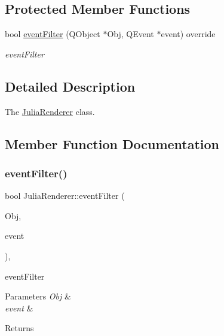 \subsection*{Protected Member Functions}
\begin{DoxyCompactItemize}
\item 
bool \hyperlink{classJuliaRenderer_a21a8248c28cf0035a14ad1ef98761356}{event\+Filter} (Q\+Object $\ast$Obj, Q\+Event $\ast$event) override
\begin{DoxyCompactList}\small\item\em event\+Filter \end{DoxyCompactList}\end{DoxyCompactItemize}


\subsection{Detailed Description}
The \hyperlink{classJuliaRenderer}{Julia\+Renderer} class. 

\subsection{Member Function Documentation}
\mbox{\label{classJuliaRenderer_a21a8248c28cf0035a14ad1ef98761356}} 
\subsubsection{\texorpdfstring{event\+Filter()}{eventFilter()}}
{\footnotesize\ttfamily bool Julia\+Renderer\+::event\+Filter (\begin{DoxyParamCaption}\item[{Q\+Object $\ast$}]{Obj,  }\item[{Q\+Event $\ast$}]{event }\end{DoxyParamCaption})\hspace{0.3cm}{\ttfamily [override]}, {\ttfamily [protected]}}



event\+Filter 


\begin{DoxyParams}{Parameters}
{\em Obj} & \\
\hline
{\em event} & \\
\hline
\end{DoxyParams}
\begin{DoxyReturn}{Returns}

\end{DoxyReturn}
\mbox{\label{classJuliaRenderer_a2231caba8e65e19eb3074670c96e705f}} 
